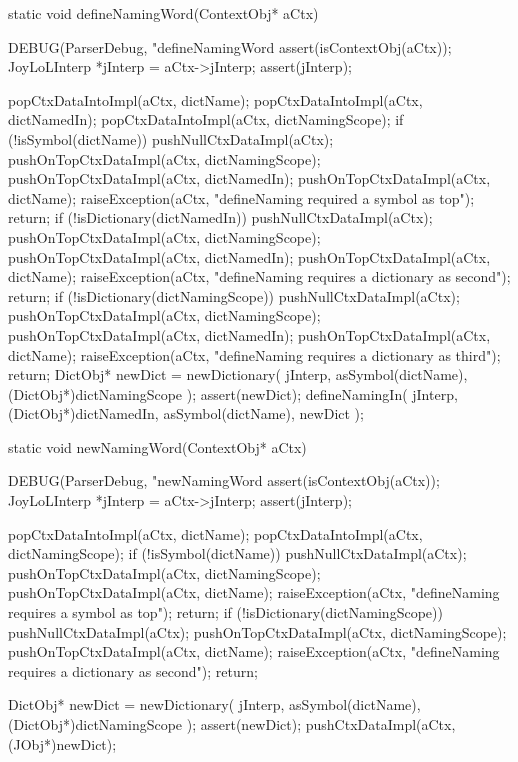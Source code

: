 \startCCode
static void defineNamingWord(ContextObj* aCtx) {
  DEBUG(ParserDebug, "defineNamingWord%
  assert(isContextObj(aCtx));
  JoyLoLInterp *jInterp = aCtx->jInterp;
  assert(jInterp);
  
  popCtxDataIntoImpl(aCtx, dictName);
  popCtxDataIntoImpl(aCtx, dictNamedIn);
  popCtxDataIntoImpl(aCtx, dictNamingScope);
  if (!isSymbol(dictName)) {
    pushNullCtxDataImpl(aCtx);
    pushOnTopCtxDataImpl(aCtx, dictNamingScope);
    pushOnTopCtxDataImpl(aCtx, dictNamedIn);
    pushOnTopCtxDataImpl(aCtx, dictName);
    raiseException(aCtx,
      "defineNaming required a symbol as top");
    return;
  }
  if (!isDictionary(dictNamedIn)) {
    pushNullCtxDataImpl(aCtx);
    pushOnTopCtxDataImpl(aCtx, dictNamingScope);
    pushOnTopCtxDataImpl(aCtx, dictNamedIn);
    pushOnTopCtxDataImpl(aCtx, dictName);
    raiseException(aCtx,
      "defineNaming requires a dictionary as second");
    return;
  }
  if (!isDictionary(dictNamingScope)) {
    pushNullCtxDataImpl(aCtx);
    pushOnTopCtxDataImpl(aCtx, dictNamingScope);
    pushOnTopCtxDataImpl(aCtx, dictNamedIn);
    pushOnTopCtxDataImpl(aCtx, dictName);
    raiseException(aCtx,
      "defineNaming requires a dictionary as third");
    return;
  }
  DictObj* newDict =
    newDictionary(
      jInterp,
      asSymbol(dictName),
      (DictObj*)dictNamingScope
    );
  assert(newDict);
  defineNamingIn(
    jInterp,
    (DictObj*)dictNamedIn,
    asSymbol(dictName),
    newDict
  );
}
\stopCCode

\startCCode
static void newNamingWord(ContextObj* aCtx) {
  DEBUG(ParserDebug, "newNamingWord%
  assert(isContextObj(aCtx));
  JoyLoLInterp *jInterp = aCtx->jInterp;
  assert(jInterp);

  popCtxDataIntoImpl(aCtx, dictName);
  popCtxDataIntoImpl(aCtx, dictNamingScope);
  if (!isSymbol(dictName)) {
    pushNullCtxDataImpl(aCtx);
    pushOnTopCtxDataImpl(aCtx, dictNamingScope);
    pushOnTopCtxDataImpl(aCtx, dictName);
    raiseException(aCtx,
      "defineNaming requires a symbol as top");
    return;
  }
  if (!isDictionary(dictNamingScope)) {
    pushNullCtxDataImpl(aCtx);
    pushOnTopCtxDataImpl(aCtx, dictNamingScope);
    pushOnTopCtxDataImpl(aCtx, dictName);
    raiseException(aCtx,
      "defineNaming requires a dictionary as second");
    return;
  }

  DictObj* newDict =
    newDictionary(
      jInterp,
      asSymbol(dictName),
      (DictObj*)dictNamingScope
    );
  assert(newDict);
  pushCtxDataImpl(aCtx, (JObj*)newDict);
}
\stopCCode

